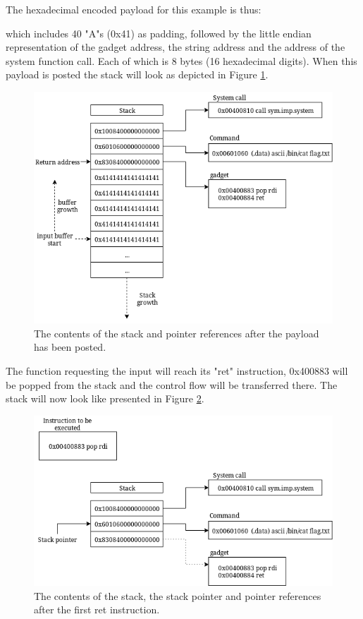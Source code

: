 The hexadecimal encoded payload for this example is thus:


which includes 40 "A"s (0x41) as padding, followed by the little endian representation of
the gadget address, the string address and the address of the system function call. Each
of which is 8 bytes (16 hexadecimal digits). When this payload is posted the stack will
look as depicted in Figure \ref{fig:after-payload}.

\begin{figure}[h]
	\centering
	\includegraphics[width=\textwidth]{background/software-diversity/figures/after-payload}
	\caption{The contents of the stack and pointer references after the payload has been posted.}
	\label{fig:after-payload}
\end{figure}

The function requesting the input will reach its "ret" instruction, 0x400883 will be popped
from the stack and the control flow will be transferred there. The stack will now look like
presented in Figure \ref{fig:after-first}.

\begin{figure}[h]
	\centering
	\includegraphics[width=\textwidth]{background/software-diversity/figures/after-first}
	\caption{The contents of the stack, the stack pointer and pointer references after the first ret instruction.}
	\label{fig:after-first}
\end{figure}

